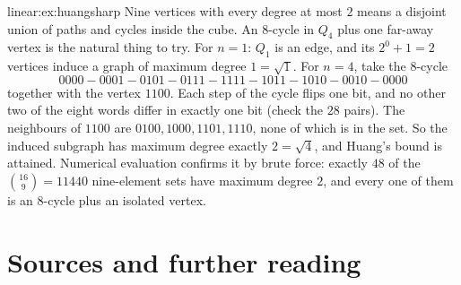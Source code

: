 \begin{solution}{linear:ex:huangsharp}
\idea Nine vertices with every degree at most $2$ means a disjoint union of paths and cycles inside the cube. An $8$-cycle in $Q_4$
plus one far-away vertex is the natural thing to try.
\writeup For $n=1$: $Q_1$ is an edge, and its $2^0+1=2$ vertices induce a graph of maximum degree $1=\sqrt1$. For $n=4$, take the
$8$-cycle
\[
0000-0001-0101-0111-1111-1011-1010-0010-0000
\]
together with the vertex $1100$. Each step of the cycle flips one bit, and no other two of the eight words differ in exactly one
bit (check the $28$ pairs). The neighbours of $1100$ are $0100,1000,1101,1110$, none of which is in the set. So the induced
subgraph has maximum degree exactly $2=\sqrt4$, and Huang's bound is attained. Numerical evaluation confirms it by brute force: exactly
$48$ of the $\binom{16}9=11440$ nine-element sets have maximum degree $2$, and every one of them is an $8$-cycle plus an isolated
vertex.
\end{solution}

\section*{Sources and further reading}

